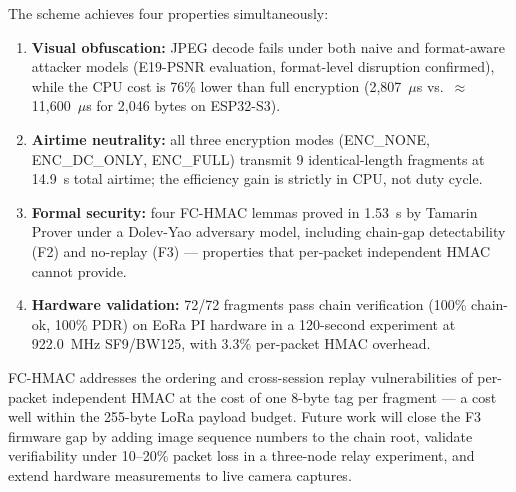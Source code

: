 \documentclass[journal]{IEEEtran}
\begin{document}
The scheme achieves four properties simultaneously:
\begin{enumerate}
  \item \textbf{Visual obfuscation:} JPEG decode fails under both naive and
    format-aware attacker models (E19-PSNR evaluation, format-level disruption
    confirmed), while the CPU cost is 76\% lower than full encryption
    (2{,}807~$\mu$s vs.\ $\approx$11{,}600~$\mu$s for 2{,}046 bytes on ESP32-S3).
  \item \textbf{Airtime neutrality:} all three encryption modes (ENC\_NONE,
    ENC\_DC\_ONLY, ENC\_FULL) transmit 9 identical-length fragments at 14.9~s
    total airtime; the efficiency gain is strictly in CPU, not duty cycle.
  \item \textbf{Formal security:} four FC-HMAC lemmas proved in 1.53~s by
    Tamarin Prover under a Dolev-Yao adversary model, including chain-gap
    detectability (F2) and no-replay (F3) --- properties that per-packet
    independent HMAC cannot provide.
  \item \textbf{Hardware validation:} 72/72 fragments pass chain verification
    (100\% chain-ok, 100\% PDR) on EoRa PI hardware in a 120-second experiment
    at 922.0~MHz SF9/BW125, with 3.3\% per-packet HMAC overhead.
\end{enumerate}

FC-HMAC addresses the ordering and cross-session replay vulnerabilities of
per-packet independent HMAC at the cost of one 8-byte tag per fragment --- a
cost well within the 255-byte LoRa payload budget.  Future work will close the
F3 firmware gap by adding image sequence numbers to the chain root, validate
verifiability under 10--20\% packet loss in a three-node relay experiment,
and extend hardware measurements to live camera captures.



\end{document}
